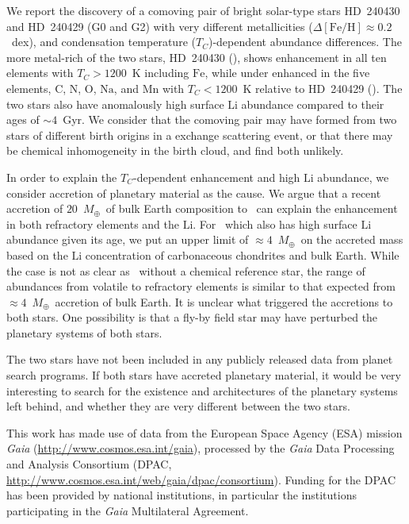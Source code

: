 \documentclass[modern, letterpaper]{aastex61}
\newcommand*\elem[1]{\ensuremath{\mathrm{#1}}}
\newcommand*\elemH[1]{\ensuremath{[\mathrm{#1}/\elem{H}]}}
\newcommand*{\feh}{\ensuremath{\elemH{Fe}}}
\newcommand{\sunanalog}{\text{Krios}}
\newcommand{\bizarreone}{\text{Kronos}}
\newcommand{\Tcondens}{\ensuremath{T_C}}
\newcommand{\mearth}{\ensuremath{M_\oplus}}
\begin{document}
We report the discovery of a comoving pair of bright
solar-type stars HD~240430 and HD~240429 (G0 and G2) with very different
metallicities ($\Delta\feh \approx 0.2$~dex), and condensation temperature
(\Tcondens)-dependent abundance differences.
The more metal-rich of the two stars, HD~240430 (\bizarreone), shows enhancement in
all ten elements with $\Tcondens > 1200$~K including \elem{Fe}, while under
enhanced in the five elements, \elem{C}, \elem{N}, \elem{O}, \elem{Na}, and
\elem{Mn} with $\Tcondens < 1200$~K relative to HD~240429 (\sunanalog).
The two stars also have anomalously high surface \elem{Li} abundance compared
to their ages of $\sim 4$~Gyr.
We consider that the comoving pair may have formed from two stars of different
birth origins in a exchange scattering event, or that there may be chemical
inhomogeneity in the birth cloud, and find both unlikely.

In order to explain the $\Tcondens$-dependent enhancement and high \elem{Li}
abundance, we consider accretion of planetary material as the cause.
We argue that a recent accretion of $20$~\mearth\ of bulk Earth
composition to \bizarreone\ can explain the enhancement in both refractory
elements and the \elem{Li}.
For \sunanalog\ which also has high surface \elem{Li} abundance given its age,
we put an upper limit of $\approx 4$~\mearth\ on the accreted mass
based on the \elem{Li} concentration of carbonaceous chondrites and bulk Earth.
While the case is not as clear as \bizarreone\ without a chemical reference star,
the range of abundances from volatile to refractory elements is
similar to that expected from $\approx 4$~\mearth\ accretion of bulk Earth.
It is unclear what triggered the accretions to both stars.
One possibility is that a fly-by field star may have
perturbed the planetary systems of both stars.

The two stars have not been included in any publicly released data from planet
search programs.
If both stars have accreted planetary material, it would be very interesting to
search for the existence and architectures of the planetary systems left
behind, and whether they are very different between the two stars.


\acknowledgements

This work has made use of data from the European Space Agency (ESA) mission
{\it Gaia} (\url{http://www.cosmos.esa.int/gaia}), processed by the {\it Gaia}
Data Processing and Analysis Consortium (DPAC,
\url{http://www.cosmos.esa.int/web/gaia/dpac/consortium}). Funding for the DPAC
has been provided by national institutions, in particular the institutions
participating in the {\it Gaia} Multilateral Agreement.
\end{document}
